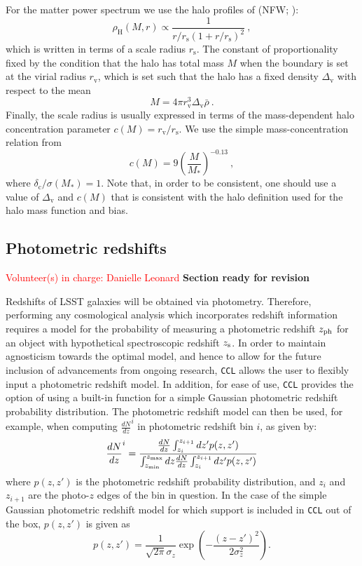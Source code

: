 \documentclass[\docopts]{\docclass}
\newcommand{\vol}[1]{\textcolor{red}{Volunteer(s) in charge: #1}}
\newcommand{\revise}{\textcolor{red!55!blue}{\bf Section ready for revision}}
\newcommand{\ccl}{{\tt CCL}\xspace}
\begin{document}
For the matter power spectrum we use the halo profiles of \citeauthor*{Navarro1997} (NFW; \citeyear{Navarro1997}):
\begin{equation}
\rho_\mathrm{H}(M,r)\propto\frac{1}{r/r_\mathrm{s}(1+r/r_\mathrm{s})^2}\ ,
\label{eq:NFW_profile}
\end{equation}
which is written in terms of a scale radius $r_\mathrm{s}$. The constant of proportionality fixed by the condition that the halo has total mass $M$ when the boundary is set at the virial radius $r_\mathrm{v}$, which is set such that the halo has a fixed density $\Delta_\mathrm{v}$ with respect to the mean
\begin{equation}
M=4\pi r_\mathrm{v}^3\Delta_\mathrm{v}\bar\rho\ .
\label{eq:virial_radius}
\end{equation}
Finally, the scale radius is usually expressed in terms of the mass-dependent halo concentration parameter $c(M)=r_\mathrm{v}/r_\mathrm{s}$. We use the simple mass-concentration relation from \cite{Bullock2001}
\begin{equation}
c(M)=9\left(\frac{M}{M_*}\right)^{-0.13}\ ,
\end{equation}
where $\delta_\mathrm{c}/\sigma(M_*)=1$.
Note that, in order to be consistent, one should use a value of $\Delta_\mathrm{v}$ and $c(M)$ that is consistent with the halo definition used for the halo mass function and bias.

\subsection{Photometric redshifts}
\vol{Danielle Leonard}
\revise

Redshifts of LSST galaxies will be obtained via photometry. Therefore, performing any cosmological analysis which incorporates redshift information requires a model for the probability of measuring a photometric redshift $z_{\rm ph}$ for an object with hypothetical spectroscopic redshift $z_{\rm s}$.  In order to maintain agnosticism towards the optimal model, and hence to allow for the future inclusion of advancements from ongoing research, \ccl allows the user to flexibly input a photometric redshift model. In addition, for ease of use, \ccl provides the option of using a built-in function for a simple Gaussian photometric redshift probability distribution. The photometric redshift model can then be used, for example, when computing $\frac{dN}{dz}^i$ in photometric redshift bin $i$, as given by:
\begin{equation}
\frac{dN}{dz}^i = \frac{\frac{dN}{dz}\int_{z_i}^{z_{i+1}} dz' p(z,z')}{\int_{z_{\rm min}}^{z_{\rm max}}dz \frac{dN}{dz} \int_{z_i}^{z_{i+1}}dz' p(z, z')}
\label{photoz}
\end{equation}
where $p(z,z')$ is the photometric redshift probability distribution, and $z_{i}$ and $z_{i+1}$ are the photo-$z$ edges of the bin in question. In the case of the simple Gaussian photometric redshift model for which support is included in \ccl out of the box, $p(z, z')$ is given as
\begin{equation}
p(z,z') = \frac{1}{\sqrt{2 \pi}\sigma_z} \exp\left(-\frac{(z-z')^2}{2\sigma_z^2}\right).
\label{pz_gauss}
\end{equation}
\end{document}
